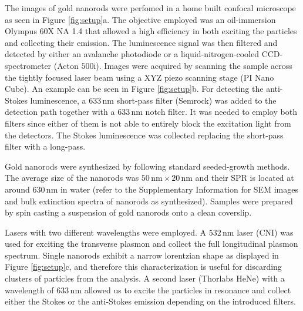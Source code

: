 \documentclass[journal=nalefd,manuscript=letter]{achemso}
\newcommand{\nm}{\ensuremath{\,\textrm{nm}}}
\begin{document}
The images of gold nanorods were perfomed in a home built confocal microscope as
seen in Figure \ref{fig:setup}a. The objective employed was an oil-immersion
Olympus 60X NA 1.4 that allowed a high efficiency in both exciting the particles
and collecting their emission. The luminescence signal was then filtered and
detected by either an avalanche photodiode or a liquid-nitrogen-cooled
CCD-spectrometer (Acton $500\textrm{i}$). Images were acquired by scanning the
sample across the tightly focused laser beam using a XYZ piezo scanning stage
(PI Nano Cube). An example can be seen in Figure \ref{fig:setup}b. For detecting
the anti-Stokes luminescence, a $633\nm$ short-pass filter (Semrock) was added
to the detection path together with a $633\nm$ notch filter. It was needed to
employ both filters since either of them is not able to entirely block the
excitation light from the detectors. The Stokes luminescence was collected
replacing the short-pass filter with a long-pass.

Gold nanorods were synthesized by following standard seeded-growth
methods\cite{Nikoobakht2003}. The average size of the nanorods was $50\nm\times
20\nm$ and their SPR is located at around $630\nm$ in water (refer to the
Supplementary Information for SEM images and bulk extinction spectra of nanorods
as synthesized). Samples were prepared by spin casting a suspension of gold
nanorods onto a clean coverslip. 

Lasers with two different wavelengths were employed. A $532\nm$ laser (CNI) was
used for exciting the transverse plasmon and collect the full longitudinal
plasmon spectrum. Single nanorods exhibit a narrow lorentzian shape as
displayed in Figure \ref{fig:setup}c, and therefore this characterization is
useful for discarding clusters of particles from the analysis. A second laser
(Thorlabs HeNe) with a wavelength of $633\nm$ allowed us to excite the particles
in resonance and collect either the Stokes or the anti-Stokes emission depending
on the introduced filters.
\end{document}
